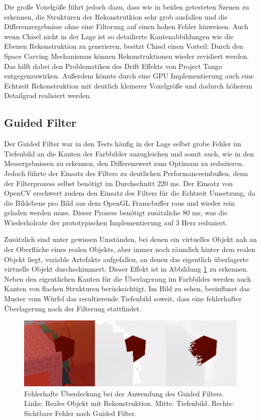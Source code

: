 Die große Voxelgöße führt jedoch dazu, dass wie in beiden getesteten Szenen zu erkennen, die Strukturen der Rekonstrutkion sehr grob ausfallen und die Differenzergebnisse ohne eine Filterung auf einen hohen Fehler hinweisen. Auch wenn Chisel nicht in der Lage ist so detailierte Kantenabbildungen wie die Ebenen Rekonstruktion zu generieren, besitzt Chisel einen Vorteil: Durch den Space Carving Mechanismus können Rekonstruktionen wieder revidiert werden. Das hilft dabei den Problematiken des Drift Effekts von Project Tango entgegenzuwirken. Außerdem könnte durch eine GPU Implementierung auch eine Echtzeit Rekonstruktion mit deutlich kleinerer Voxelgröße und dadurch höherem Detailgrad realisiert werden.


\subsection*{Guided Filter}

Der Guided Filter war in den Tests häufig in der Lage selbst grobe Fehler im Tiefenbild an die Kanten der Farbbilder anzugleichen und somit auch, wie in den Messergebnissen zu erkennen, den Differenzwert zum Optimum zu reduzieren. Jedoch führte der Einsatz des Filters zu deutlichen Performanceeinbußen, denn der Filterprozess selbst benötigt im Durchschnitt \(220\) ms. Der Einsatz von OpenCV erschwert zudem den Einsatz des Filters für die Echtzeit Umsetzung, da die Bildebene pro Bild aus dem OpenGL Framebuffer raus und wieder rein geladen werden muss. Dieser Prozess benötigt zusätzliche \(80\) ms, was die Wiederholrate der prototypischen Implementierung auf 3 Herz reduziert. 

Zusätzlich sind unter gewissen Umständen, bei denen ein virtuelles Objekt nah an der Oberfläche eines realen Objekts, aber immer noch räumlich hinter dem realen Objekt liegt, variable Artefakte aufgefallen, an denen das eigentlich überlagerte virtuelle Objekt durchschimmert. Dieser Effekt ist in Abbildung \ref{fig:artifacts} zu erkennen. Neben den eigentlichen Kanten für die Überlagerung im Farbbildes werden auch Kanten von flachen Strukturen berücksichtigt. Im Bild zu sehen, beeinflusst das Muster vom Würfel das resultierende Tiefenbild soweit, dass eine fehlerhafter Überlagerung nach der Filterung stattfindet. 
 
\begin{figure}[h]
  \centering
	\includegraphics[width=1.0\textwidth]{content/images/artifacts.png} 
  \caption{Fehlerhafte Überdeckung bei der Anwendung des Guided Filters. Links: Reales Objekt mit Rekonstruktion. Mitte: Tiefenbild. Rechts: Sichtbare Fehler nach Guided Filter.}
  \label{fig:artifacts}
\end{figure}

